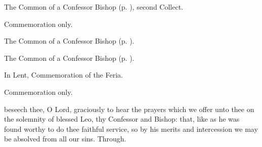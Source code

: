 
\begin{rubric}
	The Common of a Confessor Bishop (p. \pageref{CommonConfessorBishop}), second Collect.
\end{rubric}


\clearpage
{}

\begin{rubric}
	Commemoration only.
\end{rubric}

\begin{rubric}
	The Common of a Confessor Bishop (p. \pageref{ConfessorBishopDoctorCollect}).
\end{rubric}



\begin{rubric}
	The Common of a Confessor Bishop (p. \pageref{CommonConfessorBishop}).
\end{rubric}

\begin{rubric}
    In Lent, Commemoration of the Feria.
\end{rubric}



\begin{rubric}
	Commemoration only.
\end{rubric}


{} beseech thee, O Lord, graciously to hear the prayers which we offer unto thee on the solemnity of blessed Leo, thy Confessor and Bishop: that, like as he was found worthy to do thee faithful service, so by his merits and intercession we may be absolved from all our sins. Through.



